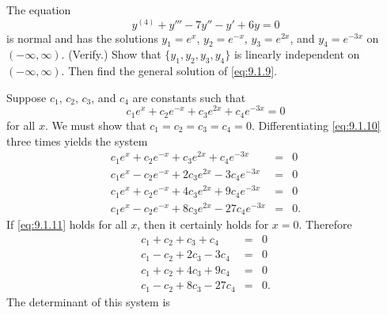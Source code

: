 \documentclass{ximera}
\begin{document}
\begin{example}
\begin{explanation}
\end{explanation}
\end{example}

\begin{example}\label{example:9.1.2}
The equation
\begin{equation}\label{eq:9.1.9}
y^{(4)}+y'''-7y''-y'+6y=0
\end{equation}
is normal and has the solutions $y_1=e^x$, $y_2=e^{-x}$, $y_3=e^{2x}$,
and $y_4=e^{-3x}$ on $(-\infty,\infty)$. (Verify.) Show that
$\{y_1,y_2,y_3,y_4\}$ is linearly independent on $(-\infty,\infty)$.
Then find the general solution of \eqref{eq:9.1.9}.

\begin{explanation}
Suppose   $c_1$, $c_2$, $c_3$, and $c_4$
are constants such that
\begin{equation} \label{eq:9.1.10}
c_1e^x+c_2e^{-x}+c_3e^{2x}+c_4e^{-3x}=0
\end{equation}
for all $x$. We must show that $c_1=c_2=c_3=c_4=0$. Differentiating
\eqref{eq:9.1.10} three times yields the system
\begin{equation} \label{eq:9.1.11}
\begin{array}{rcl}
c_1e^x+c_2e^{-x}+c_3e^{2x}+c_4e^{-3x}&=&0\\
c_1e^x-c_2e^{-x}+2c_3e^{2x}-3c_4e^{-3x}&=&0\\
c_1e^x+c_2e^{-x}+4c_3e^{2x}+9c_4e^{-3x}&=&0\\
c_1e^x-c_2e^{-x}+8c_3e^{2x}-27c_4e^{-3x}&=&0.
\end{array}
\end{equation}
If \eqref{eq:9.1.11} holds for all $x$, then it certainly holds for $x=0$.
Therefore
$$
\begin{array}{rcl}
c_1+c_2+c_3+c_4&=&0\\
c_1-c_2+2c_3-3c_4&=&0\\
c_1+c_2+4c_3+9c_4&=&0\\
c_1-c_2+8c_3-27c_4&=&0.
\end{array}
$$
The determinant of this system is


\end{explanation}
\end{example}
\end{document}
